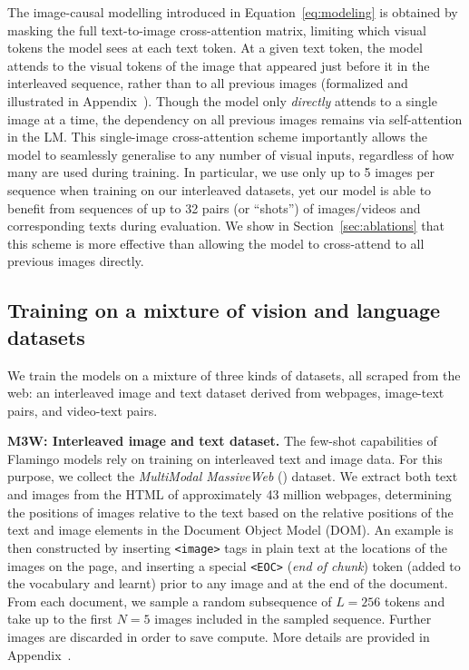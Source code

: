 The image-causal modelling introduced in Equation~\eqref{eq:modeling} is obtained by masking the full text-to-image cross-attention matrix,
limiting which visual tokens the model sees at each text token.
At a given text token, the model attends to the visual tokens of the image that appeared just before it in the interleaved sequence, rather than to all previous images (formalized and illustrated in Appendix~).
Though the model only \textit{directly} attends to a single image at a time, the dependency on all previous images remains via self-attention in the LM.
This single-image cross-attention scheme importantly allows the model to seamlessly generalise to any number of visual inputs, regardless of how many are used during training.
In particular, we use only up to 5 images per sequence when training on our interleaved datasets, yet our model is able to benefit from sequences of up to 32 pairs (or ``shots'') of images/videos and corresponding texts during evaluation.
We show in Section~\ref{sec:ablations} that this scheme is more effective than allowing the model to cross-attend to all previous images directly.




\subsection{Training on a mixture of vision and language datasets}
\label{sec:datasets}\label{sec:training}


We train the \method{} models on a mixture of three kinds of datasets, all scraped from the web: an interleaved image and text dataset derived from webpages, image-text pairs, and video-text pairs. 


\textbf{M3W: Interleaved image and text dataset.}
\label{sec:interleaved_datasets}
The few-shot capabilities of Flamingo models rely on training on interleaved text and image data.
For this purpose, we collect the \emph{MultiModal MassiveWeb} (\mmmw) dataset.
We extract both text and images from the HTML of approximately 43 million webpages, determining the positions of images relative to the text based on the relative positions of the text and image elements in the Document Object Model (DOM).
An example is then constructed by inserting \texttt{<image>} tags in plain text at the locations of the images on the page, and inserting a special \texttt{<EOC>} (\textit{end of chunk}) token (added to the vocabulary and learnt) prior to any image and at the end of the document.
From each document, we sample a random subsequence of $L=256$ tokens and take up to the first $N=5$ images included in the sampled sequence.
Further images are discarded in order to save compute.
More details are provided in Appendix~.

